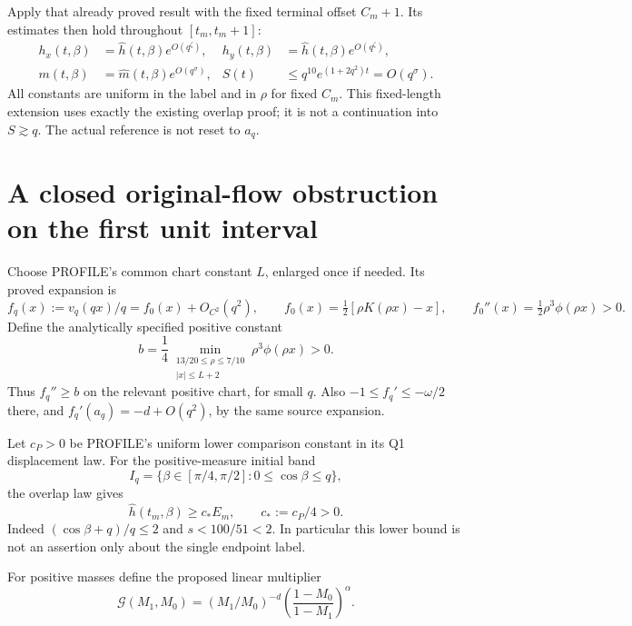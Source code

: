 \documentclass[11pt]{article}
\theoremstyle{remark}\newtheorem{remark}[theorem]{Remark}
\begin{document}
Apply that already proved result with the fixed terminal offset
$C_m+1$. Its estimates then hold throughout $[t_m,t_m+1]$:
\begin{align}
 h_x(t,\beta)&=\widehat h(t,\beta)e^{O(q^\zeta)},&
 h_y(t,\beta)&=\widehat h(t,\beta)e^{O(q^\zeta)},
 \label{an02smcpv1:shorttransfer}\\
 m(t,\beta)&=\widehat m(t,\beta)e^{O(q^\sigma)},&
 S(t)&\le q^{10}e^{(1+2q^2)t}=O(q^\sigma).
 \label{an02smcpv1:shortmass}
\end{align}
All constants are uniform in the label and in $\rho$ for fixed
$C_m$. This fixed-length extension uses exactly the existing
overlap proof; it is not a continuation into $S\gtrsim q$.
The actual reference is not reset to $a_q$.

\section{A closed original-flow obstruction on the first unit interval}
Choose PROFILE's common chart constant $L$, enlarged once if
needed. Its proved expansion is
\begin{equation}\label{an02smcpv1:scalar}
 f_q(x):=v_q(qx)/q=f_0(x)+O_{C^2}(q^2),\qquad
 f_0(x)=\tfrac12[\rho K(\rho x)-x],\qquad
 f_0''(x)=\tfrac12\rho^3\phi(\rho x)>0.
\end{equation}
Define the analytically specified positive constant
\begin{equation}\label{an02smcpv1:curvature}
 b=\frac14\min_{\substack{13/20\le\rho\le7/10\\|x|\le L+2}}
                \rho^3\phi(\rho x)>0.
\end{equation}
Thus $f_q''\ge b$ on the relevant positive chart, for small $q$.
Also $-1\le f_q'\le-\omega/2$ there, and
$f_q'(a_q)=-d+O(q^2)$, by the same source expansion.

Let $c_P>0$ be PROFILE's uniform lower comparison constant in
its Q1 displacement law. For the positive-measure initial band
\[
 I_q=\{\beta\in[\pi/4,\pi/2]:0\le\cos\beta\le q\},
\]
the overlap law gives
\begin{equation}\label{an02smcpv1:outerlower}
 \widehat h(t_m,\beta)\ge c_*E_m,\qquad c_*:=c_P/4>0.
\end{equation}
Indeed $(\cos\beta+q)/q\le2$ and
$s<100/51<2$. In particular this lower bound is not an
assertion only about the single endpoint label.

For positive masses define the proposed linear multiplier
\begin{equation}\label{an02smcpv1:multiplier}
 \mathcal G(M_1,M_0)=
 (M_1/M_0)^{-d}\left(\frac{1-M_0}{1-M_1}\right)^\alpha.
\end{equation}
\end{document}

